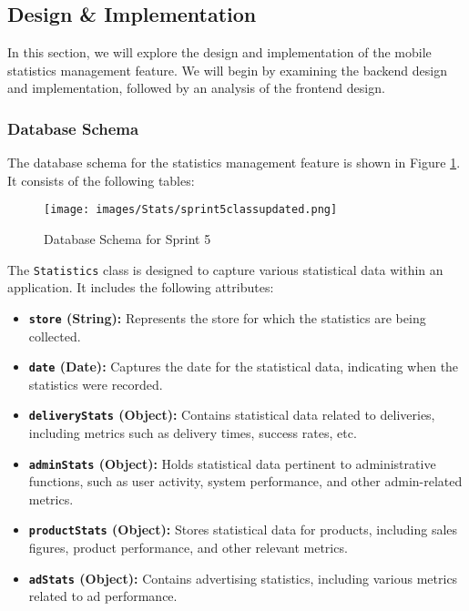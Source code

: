 \subsection{Design \& Implementation}

In this section, we will explore the design and implementation of the mobile statistics management feature. We will begin by examining the backend design and implementation, followed by an analysis of the frontend design.

\subsubsection{Database Schema}

The database schema for the statistics management feature is shown in Figure \ref{fig:db_schema_sprint5}. It consists of the following tables:

\begin{figure}[H]
    \centering
    \texttt{[image: images/Stats/sprint5classupdated.png]}
    \caption{Database Schema for Sprint 5}
    \label{fig:db_schema_sprint5}
\end{figure}

The \texttt{Statistics} class is designed to capture various statistical data within an application. It includes the following attributes:

\begin{itemize}
    \item \textbf{\texttt{store} (String):} Represents the store for which the statistics are being collected.
    \item \textbf{\texttt{date} (Date):} Captures the date for the statistical data, indicating when the statistics were recorded.
    \item \textbf{\texttt{deliveryStats} (Object):} Contains statistical data related to deliveries, including metrics such as delivery times, success rates, etc.
    \item \textbf{\texttt{adminStats} (Object):} Holds statistical data pertinent to administrative functions, such as user activity, system performance, and other admin-related metrics.
    \item \textbf{\texttt{productStats} (Object):} Stores statistical data for products, including sales figures, product performance, and other relevant metrics.
    \item \textbf{\texttt{adStats} (Object):} Contains advertising statistics, including various metrics related to ad performance.
\end{itemize}

